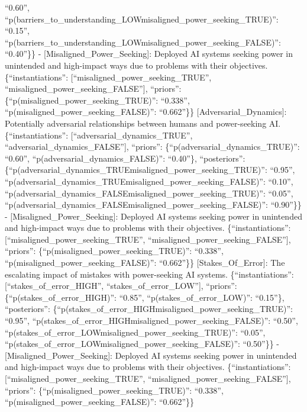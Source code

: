 \documentclass[
  11pt,
  letterpaper,
]{book}
\begin{document}
``0.60'',
``p(barriers\_to\_understanding\_LOW\textbar misaligned\_power\_seeking\_TRUE)'':
``0.15'',
``p(barriers\_to\_understanding\_LOW\textbar misaligned\_power\_seeking\_FALSE)'':
``0.40''\}\} - {[}Misaligned\_Power\_Seeking{]}: Deployed AI systems
seeking power in unintended and high-impact ways due to problems with
their objectives. \{``instantiations'':
{[}``misaligned\_power\_seeking\_TRUE'',
``misaligned\_power\_seeking\_FALSE''{]}, ``priors'':
\{``p(misaligned\_power\_seeking\_TRUE)'': ``0.338'',
``p(misaligned\_power\_seeking\_FALSE)'': ``0.662''\}\}
{[}Adversarial\_Dynamics{]}: Potentially adversarial relationships
between humans and power-seeking AI. \{``instantiations'':
{[}``adversarial\_dynamics\_TRUE'', ``adversarial\_dynamics\_FALSE''{]},
``priors'': \{``p(adversarial\_dynamics\_TRUE)'': ``0.60'',
``p(adversarial\_dynamics\_FALSE)'': ``0.40''\}, ``posteriors'':
\{``p(adversarial\_dynamics\_TRUE\textbar misaligned\_power\_seeking\_TRUE)'':
``0.95'',
``p(adversarial\_dynamics\_TRUE\textbar misaligned\_power\_seeking\_FALSE)'':
``0.10'',
``p(adversarial\_dynamics\_FALSE\textbar misaligned\_power\_seeking\_TRUE)'':
``0.05'',
``p(adversarial\_dynamics\_FALSE\textbar misaligned\_power\_seeking\_FALSE)'':
``0.90''\}\} - {[}Misaligned\_Power\_Seeking{]}: Deployed AI systems
seeking power in unintended and high-impact ways due to problems with
their objectives. \{``instantiations'':
{[}``misaligned\_power\_seeking\_TRUE'',
``misaligned\_power\_seeking\_FALSE''{]}, ``priors'':
\{``p(misaligned\_power\_seeking\_TRUE)'': ``0.338'',
``p(misaligned\_power\_seeking\_FALSE)'': ``0.662''\}\}
{[}Stakes\_Of\_Error{]}: The escalating impact of mistakes with
power-seeking AI systems. \{``instantiations'':
{[}``stakes\_of\_error\_HIGH'', ``stakes\_of\_error\_LOW''{]},
``priors'': \{``p(stakes\_of\_error\_HIGH)'': ``0.85'',
``p(stakes\_of\_error\_LOW)'': ``0.15''\}, ``posteriors'':
\{``p(stakes\_of\_error\_HIGH\textbar misaligned\_power\_seeking\_TRUE)'':
``0.95'',
``p(stakes\_of\_error\_HIGH\textbar misaligned\_power\_seeking\_FALSE)'':
``0.50'',
``p(stakes\_of\_error\_LOW\textbar misaligned\_power\_seeking\_TRUE)'':
``0.05'',
``p(stakes\_of\_error\_LOW\textbar misaligned\_power\_seeking\_FALSE)'':
``0.50''\}\} - {[}Misaligned\_Power\_Seeking{]}: Deployed AI systems
seeking power in unintended and high-impact ways due to problems with
their objectives. \{``instantiations'':
{[}``misaligned\_power\_seeking\_TRUE'',
``misaligned\_power\_seeking\_FALSE''{]}, ``priors'':
\{``p(misaligned\_power\_seeking\_TRUE)'': ``0.338'',
``p(misaligned\_power\_seeking\_FALSE)'': ``0.662''\}\}
\end{document}
